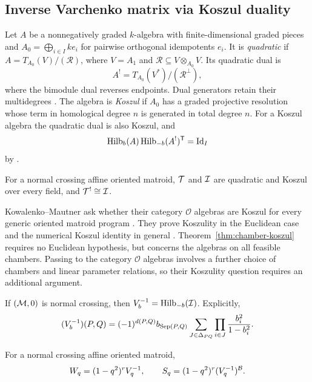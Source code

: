 \subsection{Inverse Varchenko matrix via Koszul duality}
Let $A$ be a nonnegatively graded $k$-algebra with finite-dimensional
graded pieces and $A_0=\bigoplus_{i\in I}ke_i$ for pairwise orthogonal
idempotents $e_i$. It is \emph{quadratic} if
$A=T_{A_0}(V)/(\mathcal R)$, where $V=A_1$ and
$\mathcal R\subseteq V\otimes_{A_0}V$. Its quadratic dual is
\[
 A^!=T_{A_0}(V^*)/(\mathcal R^\perp),
\]
where the bimodule dual reverses endpoints. Dual generators retain
their multidegrees \cite[Definition 2.8.1]{BeilinsonGinzburgSoergel1996}.
The algebra is \emph{Koszul} if $A_0$ has a graded projective resolution
whose term in homological degree $n$ is generated in total degree $n$.
For a Koszul algebra the quadratic dual is also Koszul, and
\[
 \operatorname{Hilb}_b(A)\operatorname{Hilb}_{-b}(A^!)^{\mathsf T}=\mathrm{Id}_I
\]
by \cite[Proposition 2.9.1 and Lemma 2.11.1]{BeilinsonGinzburgSoergel1996}.

\begin{theorem}\label{thm:chamber-koszul}
For a normal crossing affine oriented matroid, $\mathcal T$ and $\mathcal I$
are quadratic and Koszul over every field, and $\mathcal T^!\cong\mathcal I$.
\end{theorem}

\begin{remark}
Kowalenko--Mautner ask whether their category $\mathcal O$ algebras
are Koszul for every generic oriented matroid program
\cite[Section 1.3]{KowalenkoMautner}. They prove Koszulity in the
Euclidean case and the numerical Koszul identity in general
\cite[Theorems 7.13--7.14]{KowalenkoMautner}.
Theorem~\ref{thm:chamber-koszul} requires no Euclidean hypothesis,
but concerns the algebras on all feasible chambers. Passing to the
category $\mathcal O$ algebras involves a further choice of chambers
and linear parameter relations, so their Koszulity question requires
an additional argument.
\end{remark}

\begin{corollary}\label{cor:multivariate-inverse}
If $(\mathcal M,0)$ is normal crossing, then $V_b^{-1}=\operatorname{Hilb}_{-b}(\mathcal I)$. Explicitly,
\[
 (V_b^{-1})(P,Q)=(-1)^{d(P,Q)}b_{\operatorname{Sep}(P,Q)}
     \sum_{J\in\Delta_{PQ}}\prod_{i\in J}\frac{b_i^2}{1-b_i^2}.
\]
\end{corollary}

\begin{corollary}\label{thm:varinv}
For a normal crossing affine oriented matroid,
\[
 W_q=(1-q^2)^rV_q^{-1},\qquad
 S_q=(1-q^2)^r(V_q^{-1})^{\mathcal B}.
\]
\end{corollary}

